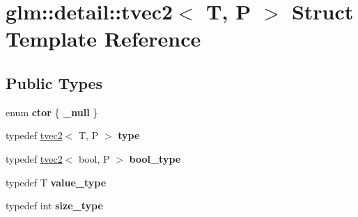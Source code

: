 \hypertarget{structglm_1_1detail_1_1tvec2}{}\section{glm\+:\+:detail\+:\+:tvec2$<$ T, P $>$ Struct Template Reference}
\label{structglm_1_1detail_1_1tvec2}
\subsection*{Public Types}
\begin{DoxyCompactItemize}
\item 
enum {\bfseries ctor} \{ {\bfseries \+\_\+null}
 \}\hypertarget{structglm_1_1detail_1_1tvec2_aa0bba0616f425fbd3fb5756aed326386}{}\label{structglm_1_1detail_1_1tvec2_aa0bba0616f425fbd3fb5756aed326386}

\item 
typedef \hyperlink{structglm_1_1detail_1_1tvec2}{tvec2}$<$ T, P $>$ {\bfseries type}\hypertarget{structglm_1_1detail_1_1tvec2_a644c796a3f1da08b7481ca69fbd10818}{}\label{structglm_1_1detail_1_1tvec2_a644c796a3f1da08b7481ca69fbd10818}

\item 
typedef \hyperlink{structglm_1_1detail_1_1tvec2}{tvec2}$<$ bool, P $>$ {\bfseries bool\+\_\+type}\hypertarget{structglm_1_1detail_1_1tvec2_af7537fd9a8c9dae6b92100b609eb2aaf}{}\label{structglm_1_1detail_1_1tvec2_af7537fd9a8c9dae6b92100b609eb2aaf}

\item 
typedef T {\bfseries value\+\_\+type}\hypertarget{structglm_1_1detail_1_1tvec2_ab8ccd2ae98b414376608059114f5af41}{}\label{structglm_1_1detail_1_1tvec2_ab8ccd2ae98b414376608059114f5af41}

\item 
typedef int {\bfseries size\+\_\+type}\hypertarget{structglm_1_1detail_1_1tvec2_a66667d9497ad5c7ff1b60bafa9fb9592}{}\label{structglm_1_1detail_1_1tvec2_a66667d9497ad5c7ff1b60bafa9fb9592}

\end{DoxyCompactItemize}
